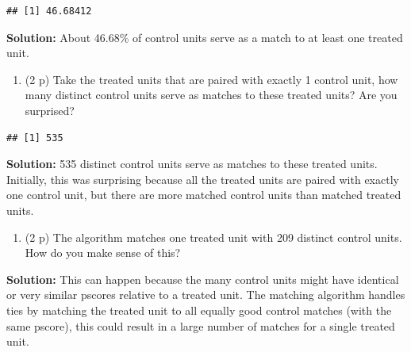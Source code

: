 \documentclass[
]{article}
\newenvironment{Shaded}{\begin{snugshade}}{\end{snugshade}}
\newcommand{\FunctionTok}[1]{\textcolor[rgb]{0.13,0.29,0.53}{\textbf{#1}}}
\newcommand{\NormalTok}[1]{#1}
\newcommand{\OtherTok}[1]{\textcolor[rgb]{0.56,0.35,0.01}{#1}}
\newcommand{\SpecialCharTok}[1]{\textcolor[rgb]{0.81,0.36,0.00}{\textbf{#1}}}
\providecommand{\tightlist}{%
  \setlength{\itemsep}{0pt}\setlength{\parskip}{0pt}}
\begin{document}
\begin{verbatim}
## [1] 46.68412
\end{verbatim}

\textbf{Solution:} About 46.68\% of control units serve as a match to at
least one treated unit.

\begin{enumerate}
\def\labelenumi{\alph{enumi}.}
\setcounter{enumi}{3}
\tightlist
\item
  (2 p) Take the treated units that are paired with exactly 1 control
  unit, how many distinct control units serve as matches to these
  treated units? Are you surprised?
\end{enumerate}

\begin{Shaded}
\end{Shaded}

\begin{verbatim}
## [1] 535
\end{verbatim}

\textbf{Solution:} 535 distinct control units serve as matches to these
treated units. Initially, this was surprising because all the treated
units are paired with exactly one control unit, but there are more
matched control units than matched treated units.

\begin{enumerate}
\def\labelenumi{\alph{enumi}.}
\setcounter{enumi}{4}
\tightlist
\item
  (2 p) The algorithm matches one treated unit with 209 distinct control
  units. How do you make sense of this?
\end{enumerate}

\textbf{Solution:} This can happen because the many control units might
have identical or very similar pscores relative to a treated unit. The
matching algorithm handles ties by matching the treated unit to all
equally good control matches (with the same pscore), this could result
in a large number of matches for a single treated unit.
\end{document}
